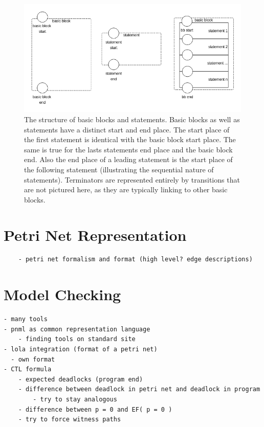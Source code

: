 \begin{figure}
    \centering
    \includegraphics[width=.9\textwidth]{../diagrams/basic_blocks.png}
    \caption{
        The structure of basic blocks and statements.
        Basic blocks as well as statements have a distinct start and end place.
        The start place of the first statement is identical with the basic block start place.
        The same is true for the lasts statements end place and the basic block end.
        Also the end place of a leading statement is the start place of the following statement (illustrating the sequential nature of statements).
        Terminators are represented entirely by transitions that are not pictured here, as they are typically linking to other basic blocks.
    }
    \label{basic_block_trans}
\end{figure}

\section{Petri Net Representation}
\label{app_petri}
\begin{verbatim}
    - petri net formalism and format (high level? edge descriptions)
\end{verbatim}


\section{Model Checking}
\label{app_mc}
\begin{verbatim}
- many tools
- pnml as common representation language
    - finding tools on standard site
- lola integration (format of a petri net)
  - own format
- CTL formula
    - expected deadlocks (program end)
    - difference between deadlock in petri net and deadlock in program
        - try to stay analogous
    - difference between p = 0 and EF( p = 0 )
    - try to force witness paths
\end{verbatim}

